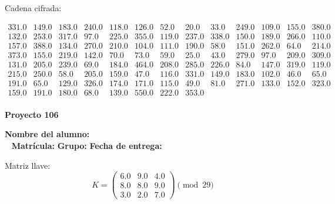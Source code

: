 \documentclass[12pt]{article}
\begin{document}
Cadena cifrada:
\begin{center}
$\begin{array}{lllllllllllll}
331.0 & 149.0 & 183.0 & 240.0 & 118.0 & 126.0 & 52.0 & 20.0 & 33.0 & 249.0 & 109.0 & 155.0 & 380.0\\
132.0 & 253.0 & 317.0 & 97.0 & 225.0 & 355.0 & 119.0 & 237.0 & 338.0 & 150.0 & 189.0 & 266.0 & 110.0\\
157.0 & 388.0 & 134.0 & 270.0 & 210.0 & 104.0 & 111.0 & 190.0 & 58.0 & 151.0 & 262.0 & 64.0 & 214.0\\
373.0 & 155.0 & 219.0 & 142.0 & 70.0 & 73.0 & 59.0 & 25.0 & 43.0 & 279.0 & 97.0 & 209.0 & 309.0\\
131.0 & 205.0 & 239.0 & 69.0 & 184.0 & 464.0 & 208.0 & 285.0 & 226.0 & 84.0 & 147.0 & 319.0 & 119.0\\
215.0 & 250.0 & 58.0 & 205.0 & 159.0 & 47.0 & 116.0 & 331.0 & 149.0 & 183.0 & 102.0 & 46.0 & 65.0\\
191.0 & 65.0 & 129.0 & 326.0 & 174.0 & 171.0 & 115.0 & 49.0 & 81.0 & 271.0 & 133.0 & 152.0 & 323.0\\
159.0 & 191.0 & 180.0 & 68.0 & 139.0 & 550.0 & 222.0 & 353.0\\
\end{array}$
\end{center}

\newpage


\textbf{Proyecto 106}

\textbf{Nombre del alumno:} \underline{\hspace{13cm}}\\\
\vspace{1cm}
\textbf{Matrícula:} \underline{\hspace{4cm}} \hspace{1cm}
\textbf{Grupo:} \underline{\hspace{2cm}}
\textbf{Fecha de entrega:} \underline{\hspace{2cm}}

\medskip

Matriz llave:
\[
K = \begin{pmatrix}
6.0 & 9.0 & 4.0\\
8.0 & 8.0 & 9.0\\
3.0 & 2.0 & 7.0
\end{pmatrix} \pmod{29}
\]
\end{document}
